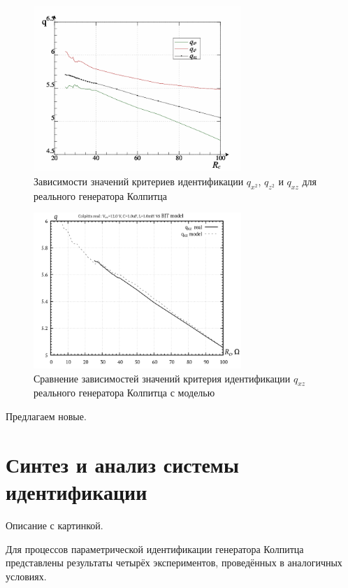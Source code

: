 \begin{figure}[htb!]
\centerline{\includegraphics[width=0.7\textwidth]{p/colp_read_q-p_Rc_q.png} }
  \caption{Зависимости значений критериев идентификации $q_{x^2}$, $q_{z^2}$ и $q_{xz}$ для реального генератора Колпитца}
\label{atu:f:colp_read_q-p_Rc_q-p_Rc_q}
\end{figure}

\begin{figure}[htb!]
\centerline{\includegraphics[width=0.7\textwidth]{p/colp_q_cml.png} }
\caption{Сравнение зависимостей значений критерия идентификации $q_{xz}$ реального генератора Колпитца с моделью}
\label{atu:f:colp_q_cml}
\end{figure}

Предлагаем новые.


\section{Синтез и анализ системы идентификации}  %

Описание с картинкой.

Для процессов параметрической идентификации генератора Колпитца представлены результаты четырёх экспериментов,
проведённых в аналогичных условиях.

